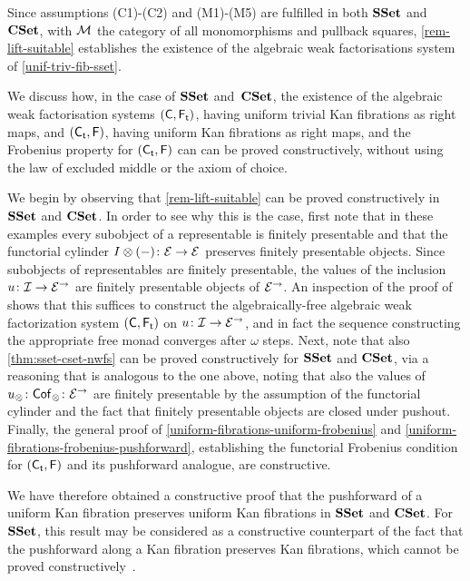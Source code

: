 \documentclass[reqno,10pt,a4paper,oneside,draft]{amsart}
\begin{document}
{{\begin{remark} \label{justify-sset-cset-examples}
Since assumptions (C1)-(C2) and (M1)-(M5) are fulfilled in both $\SSet$ and~$\CSet$, with $\cal{M}$ the category of all monomorphisms and pullback squares, \cref{rem-lift-suitable} establishes 
the existence of  the algebraic weak factorisations system  of  \cref{unif-triv-fib-sset}. 
\end{remark}


\begin{remark} \label{rem:constructive-small-object}  We discuss how, in the case of $\SSet$ and~$\CSet$, the existence of the algebraic weak factorisation systems $(\CC, \TF)$,
having uniform trivial Kan fibrations as right maps,  and $(\TC, \FF)$, having uniform Kan fibrations as right maps, and the Frobenius property for $(\TC, \FF)$  can can be proved constructively, \ie without using the law of excluded middle or the axiom of choice.

We begin by observing that \cref{rem-lift-suitable} can be proved constructively in $\SSet$ and $\CSet$. 
In order to see why this is the case, first note that in these examples every subobject of a representable is finitely presentable and that the functorial cylinder $\interval \otimes (-) \co \cal{E} \to \cal{E}$ preserves finitely presentable objects.
Since subobjects of representables are finitely presentable, the values of the inclusion $u \co \cal{I} \to \cal{E}^\to$ are finitely presentable objects of $\cal{E}^\to$.
An inspection of the proof of \cite[Theorem~4.4]{garner:small-object-argument} shows that this suffices to construct the algebraically-free algebraic weak factorization system $(\CC, \TF)$ on $u \co \cal{I} \to \cal{E}^\to$, and in fact the sequence constructing the appropriate free monad converges after $\omega$ steps. 
Next, note that also \cref{thm:sset-cset-nwfs} can be proved constructively for $\SSet$ and $\CSet$, via a reasoning that is analogous to the one above, noting that also the values of $u_\otimes \co \Cof_\otimes \co \cal{E}^\to$ are finitely presentable by the assumption of the functorial cylinder and the fact that finitely presentable objects are closed under pushout. Finally, the general proof of
\cref{uniform-fibrations-uniform-frobenius} and  \cref{uniform-fibrations-frobenius-pushforward}, establishing the functorial Frobenius condition for  $(\TC, \FF)$ and its pushforward analogue, are constructive. 

We have therefore obtained a constructive proof that the pushforward of a uniform Kan fibration preserves uniform Kan fibrations in $\SSet$ and $\CSet$. For $\SSet$,  this
result may be considered as a constructive counterpart of the fact that the pushforward along a Kan fibration preserves Kan fibrations, which cannot be proved constructively~\cite{coquand-non-constructivity-kan}. 


\end{remark}}}
\end{document}
